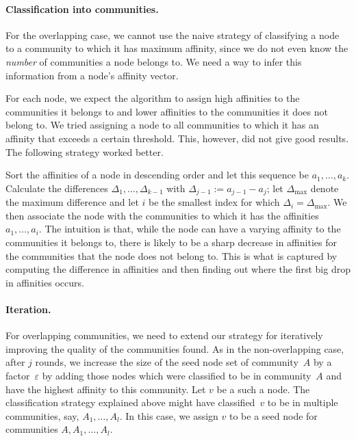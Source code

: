 \paragraph{Classification into communities.} For the overlapping case, we cannot
use the naive strategy of classifying a node to a community to which it has 
maximum affinity, since we do not even know the \emph{number} of communities a node belongs to. 
We need a way to infer this information from a node's affinity vector.

For each node, we expect the algorithm to assign high affinities to the communities 
it belongs to and lower affinities to the communities it does not belong to. 
We tried assigning a node to all communities to which it has an affinity that 
exceeds a certain threshold. This, however, did not give good results.
The following strategy worked better. 

Sort the affinities of a node in descending order and let this 
sequence be $a_1, \ldots, a_k$. Calculate the differences 
$\Delta_{1}, \ldots, \Delta_{k-1}$ with $\Delta_{j-1} := a_{j - 1} - a_j$;
let $\Delta_{\mathrm{max}}$ denote the maximum difference 
and let $i$ be the smallest index for which $\Delta_i = \Delta_{\mathrm{max}}$. We then associate 
the node with the communities to which it has the affinities $a_1, \ldots, a_i$. 
The intuition is that, while the node can have a varying affinity to the communities it belongs to, 
there is likely to be a sharp decrease in affinities for the communities that the node does 
not belong to. This is what is captured by computing the difference in affinities and then finding 
out where the first big drop in affinities occurs.

\paragraph{Iteration.}
For overlapping communities, we need to extend our strategy for iteratively improving the quality 
of the communities found. As in the non-overlapping case, after $j$ rounds, we increase the 
size of the seed node set of community~$A$ by a factor~$\varepsilon$ by adding those nodes 
which were classified to be in community~$A$ and have the highest affinity to this community. 
Let $v$ be a such a node. The classification strategy explained above might have classified~$v$ 
to be in multiple communities, say, $A_1, \dots, A_l$. In this case, we assign $v$ 
to be a seed node for communities $A, A_1, \ldots, A_l$. 

